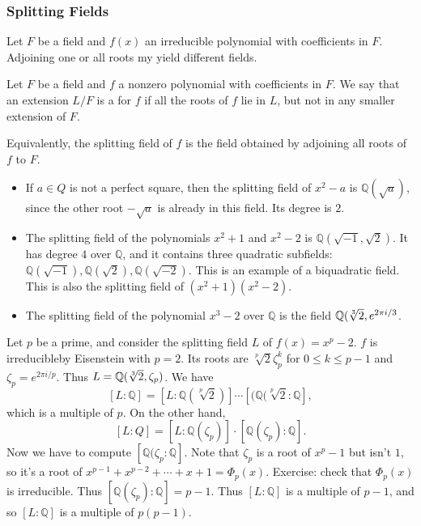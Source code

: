 \documentclass{scrartcl}
\begin{document}
\subsubsection{Splitting Fields}
Let $F$ be a field and $f(x)$ an irreducible polynomial with coefficients in $F$. Adjoining one or all roots my yield different fields.
\begin{definition}
	Let $F$ be a field and $f$ a nonzero polynomial with coefficients in $F$. We say that an extension $L/F$ is a  for $f$ if all the roots of $f$ lie in $L$, but not in any smaller extension of $F$.
\end{definition}
Equivalently, the splitting field of $f$ is the field obtained by adjoining all roots of $f$ to $F$.
\begin{example}
	\begin{itemize}
		\item If $a \in Q$ is not a perfect square, then the splitting field of $x^2-a$ is $\mathbb{Q}(\sqrt{a})$, since the other root $-\sqrt{a}$ is already in this field. Its degree is $2$. 
		\item The splitting field of the polynomials $x^2+1$ and $x^2-2$ is $\mathbb{Q}(\sqrt{-1}, \sqrt{2})$. It has degree $4$ over $\mathbb{Q}$, and it contains three quadratic subfields: $\mathbb{Q}(\sqrt{-1}), \mathbb{Q}(\sqrt{2}), \mathbb{Q}(\sqrt{-2})$. This is an example of a biquadratic field. This is also the splitting field of $(x^2+1)(x^2-2)$.
		\item The splitting field of the polynomial $x^3 - 2$ over $\mathbb{Q}$ is the field $\mathbb{Q}(\sqrt[3]{2}, e^{2\pi i/3}$.
	\end{itemize}
\end{example}

Let $p$ be a prime, and consider the splitting field $L$ of $f(x) = x^p-2$. $f$ is irreducibleby Eisenstein with $p = 2$. Its roots are $\sqrt[p]{2} \zeta_p^k$ for $0 \le k \le p-1$ and $\zeta_p = e^{2\pi i/p}$. Thus $L = \mathbb{Q}(\sqrt[3]{2}, \zeta_p)$. We have $$[L:\mathbb{Q}] = [L : \mathbb{Q}(\sqrt[p]{2})] \cdots [(\mathbb{Q}(\sqrt[p]{2} : \mathbb{Q}],$$ which is a multiple of $p$. On the other hand, $$[L:Q] = [L:\mathbb{Q}(\zeta_p)] \cdot [\mathbb{Q}(\zeta_p) : \mathbb{Q}].$$ Now we have to compute $[\mathbb{Q}(\zeta_p : \mathbb{Q}]$. Note that $\zeta_p$ is a root of $x^p-1$ but isn't $1$, so it's a root of $x^{p-1} + x^{p-2} + \cdots + x + 1 = \Phi_p(x).$ Exercise: check that $\Phi_p(x)$ is irreducible. Thus $[\mathbb{Q}(\zeta_p) : \mathbb{Q}] = p-1$. Thus $[L : \mathbb{Q}]$ is a multiple of $p-1$, and so $[L : \mathbb{Q}]$ is a multiple of $p(p-1)$.
\end{document}
